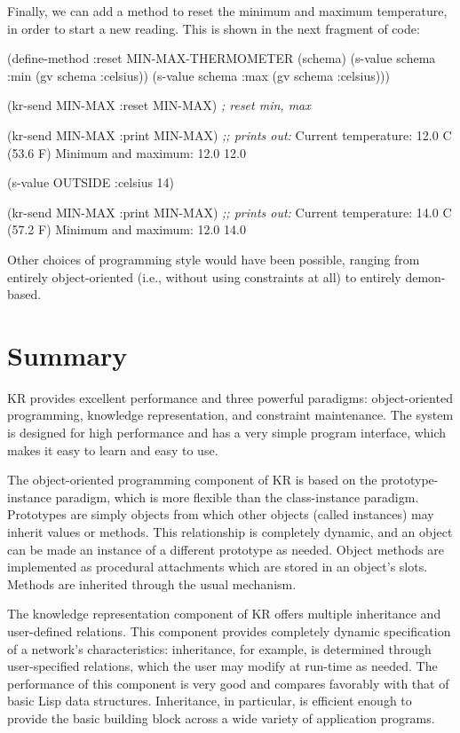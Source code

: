 Finally, we can add a method to reset the minimum and maximum temperature,
in order to start a new reading.  This is shown in the next fragment of
code:
\begin{programexample}
(define-method :reset MIN-MAX-THERMOMETER (schema)
  (s-value schema :min (gv schema :celsius))
  (s-value schema :max (gv schema :celsius)))

(kr-send MIN-MAX :reset MIN-MAX)  {\it ; reset min, max}

(kr-send MIN-MAX :print MIN-MAX)
{\it ;; prints out:}
Current temperature: 12.0 C (53.6 F)
Minimum and maximum: 12.0  12.0

(s-value OUTSIDE :celsius 14)

(kr-send MIN-MAX :print MIN-MAX)
{\it ;; prints out:}
Current temperature: 14.0 C (57.2 F)
Minimum and maximum: 12.0  14.0
\end{programexample}

Other choices of programming style would have been possible, ranging from
entirely object-oriented (i.e., without using constraints at all) to
entirely demon-based.



\chapter{Summary}
\value{top}


KR provides excellent performance and three powerful paradigms:
object-oriented programming, knowledge representation, and constraint
maintenance.  The system is designed for high performance and has a very
simple program interface, which makes it easy to learn and easy to use.

The object-oriented programming component of KR is based on the
prototype-instance paradigm, which is more flexible than the class-instance
paradigm.  Prototypes are simply
objects from which other objects (called instances) may inherit values or
methods.  This relationship is completely dynamic, and an object can be
made an instance of a different prototype as needed.  Object methods are
implemented as procedural attachments which are stored in an object's
slots.  Methods are inherited through the usual mechanism.

The knowledge representation component of KR offers
multiple inheritance and user-defined relations.  This component provides
completely dynamic specification of a network's characteristics:
inheritance, for example, is determined through user-specified relations,
which the user may modify at run-time as needed.  The performance of this
component is very good and compares favorably with that of basic Lisp data
structures.  Inheritance, in particular, is efficient enough to provide the
basic building block across a wide variety of application programs.

